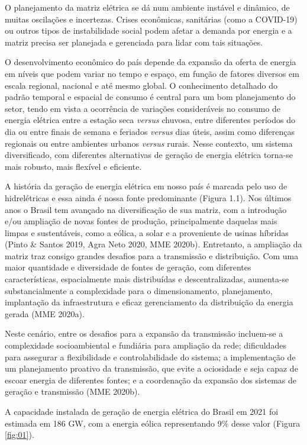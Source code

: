 \documentclass[
  oneside]{scrbook}
\begin{document}
O planejamento da matriz elétrica se dá num ambiente instável e dinâmico, de muitas oscilações e incertezas. Crises econômicas, sanitárias (como a COVID-19) ou outros tipos de instabilidade social podem afetar a demanda por energia e a matriz precisa ser planejada e gerenciada para lidar com tais situações.

O desenvolvimento econômico do país depende da expansão da oferta de energia em níveis que podem variar no tempo e espaço, em função de fatores diversos em escala regional, nacional e até mesmo global. O conhecimento detalhado do padrão temporal e espacial de consumo é central para um bom planejamento do setor, tendo em vista a ocorrência de variações consideráveis no consumo de energia elétrica entre a estação seca \emph{versus} chuvosa, entre diferentes períodos do dia ou entre finais de semana e feriados \emph{versus} dias úteis, assim como diferenças regionais ou entre ambientes urbanos \emph{versus} rurais. Nesse contexto, um sistema diversificado, com diferentes alternativas de geração de energia elétrica torna-se mais robusto, mais flexível e eficiente.

A história da geração de energia elétrica em nosso país é marcada pelo uso de hidrelétricas e essa ainda é nossa fonte predominante (Figura 1.1). Nos últimos anos o Brasil tem avançado na diversificação de sua matriz, com a introdução e/ou ampliação de novas fontes de produção, principalmente daquelas mais limpas e sustentáveis, como a eólica, a solar e a proveniente de usinas híbridas (Pinto \& Santos 2019, Agra Neto 2020, MME 2020b). Entretanto, a ampliação da matriz traz consigo grandes desafios para a transmissão e distribuição. Com uma maior quantidade e diversidade de fontes de geração, com diferentes características, espacialmente mais distribuídas e descentralizadas, aumenta-se substancialmente a complexidade para o dimensionamento, planejamento, implantação da infraestrutura e eficaz gerenciamento da distribuição da energia gerada (MME 2020a).

Neste cenário, entre os desafios para a expansão da transmissão incluem-se a complexidade socioambiental e fundiária para ampliação da rede; dificuldades para assegurar a flexibilidade e controlabilidade do sistema; a implementação de um planejamento proativo da transmissão, que evite a ociosidade e seja capaz de escoar energia de diferentes fontes; e a coordenação da expansão dos sistemas de geração e transmissão (MME 2020b).

A capacidade instalada de geração de energia elétrica do Brasil em 2021 foi estimada em 186 GW, com a energia eólica representando 9\% desse valor (Figura \ref{fig:01}).
\end{document}
